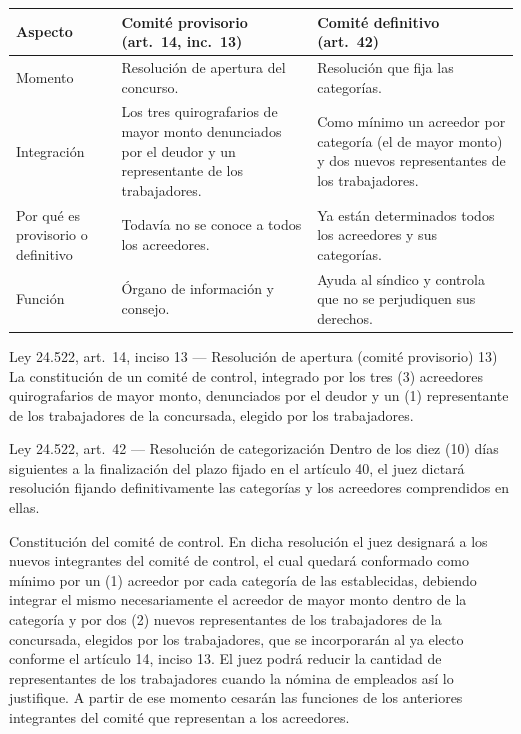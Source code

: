 \documentclass[12pt,oneside]{book}
\begin{document}
\begin{center}
\small
\begin{tabularx}{\textwidth}{P{2.4cm} Y Y}
\toprule
\textbf{Aspecto} & \textbf{Comité provisorio (art.\ 14, inc.\ 13)} & \textbf{Comité definitivo (art.\ 42)} \\
\midrule
Momento & Resolución de apertura del concurso. & Resolución que fija las categorías. \\
Integración & Los tres quirografarios de mayor monto denunciados por el deudor y un representante de los trabajadores. & Como mínimo un acreedor por categoría (el de mayor monto) y dos nuevos representantes de los trabajadores. \\
Por qué es provisorio o definitivo & Todavía no se conoce a todos los acreedores. & Ya están determinados todos los acreedores y sus categorías. \\
Función & Órgano de información y consejo. %
 & Ayuda al síndico y controla que no se perjudiquen sus derechos. \\
\bottomrule
\end{tabularx}
\end{center}

\begin{norma}{Ley 24.522, art.\ 14, inciso 13 --- Resolución de apertura (comité provisorio)}
13) La constitución de un comité de control, integrado por los tres (3) acreedores quirografarios de mayor monto, denunciados por el deudor y un (1) representante de los trabajadores de la concursada, elegido por los trabajadores.
\end{norma}

\begin{norma}{Ley 24.522, art.\ 42 --- Resolución de categorización}
Dentro de los diez (10) días siguientes a la finalización del plazo fijado en el artículo 40, el juez dictará resolución fijando definitivamente las categorías y los acreedores comprendidos en ellas.

Constitución del comité de control. En dicha resolución el juez designará a los nuevos integrantes del comité de control, el cual quedará conformado como mínimo por un (1) acreedor por cada categoría de las establecidas, debiendo integrar el mismo necesariamente el acreedor de mayor monto dentro de la categoría y por dos (2) nuevos representantes de los trabajadores de la concursada, elegidos por los trabajadores, que se incorporarán al ya electo conforme el artículo 14, inciso 13. El juez podrá reducir la cantidad de representantes de los trabajadores cuando la nómina de empleados así lo justifique. A partir de ese momento cesarán las funciones de los anteriores integrantes del comité que representan a los acreedores.
\end{norma}
\end{document}
